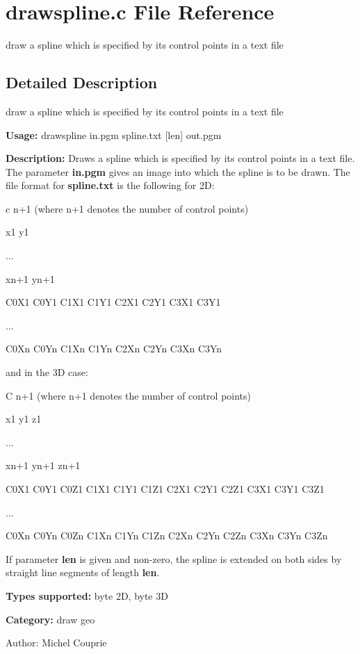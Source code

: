\section{drawspline.c File Reference}
\label{drawspline_8c}
draw a spline which is specified by its control points in a text file 



\subsection{Detailed Description}
draw a spline which is specified by its control points in a text file 

{\bf Usage:} drawspline in.pgm spline.txt [len] out.pgm

{\bf Description:} Draws a spline which is specified by its control points in a text file. The parameter {\bf in.pgm} gives an image into which the spline is to be drawn. The file format for {\bf spline.txt} is the following for 2D:

c n+1 (where n+1 denotes the number of control points)\par
 x1 y1\par
 ...\par
 xn+1 yn+1\par
 C0X1 C0Y1 C1X1 C1Y1 C2X1 C2Y1 C3X1 C3Y1\par
 ...\par
 C0Xn C0Yn C1Xn C1Yn C2Xn C2Yn C3Xn C3Yn\par


and in the 3D case:

C n+1 (where n+1 denotes the number of control points)\par
 x1 y1 z1\par
 ...\par
 xn+1 yn+1 zn+1\par
 C0X1 C0Y1 C0Z1 C1X1 C1Y1 C1Z1 C2X1 C2Y1 C2Z1 C3X1 C3Y1 C3Z1\par
 ...\par
 C0Xn C0Yn C0Zn C1Xn C1Yn C1Zn C2Xn C2Yn C2Zn C3Xn C3Yn C3Zn\par


If parameter {\bf len} is given and non-zero, the spline is extended on both sides by straight line segments of length {\bf len}.

{\bf Types supported:} byte 2D, byte 3D

{\bf Category:} draw geo

\begin{Desc}
\item[Author:]Michel Couprie \end{Desc}

